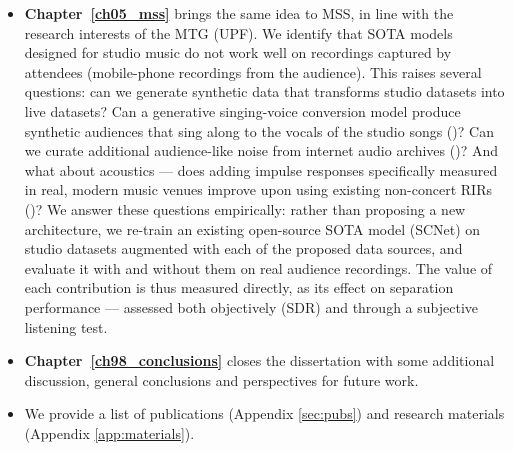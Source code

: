 \begin{itemize}
    \item \textbf{Chapter~\ref{ch05_mss}} brings the same idea to \acrfull{MSS}, in line with the research interests of the MTG (UPF). We identify that \acrfull{SOTA} models designed for studio music do not work well on recordings captured by attendees (mobile-phone recordings from the audience). This raises several questions: can we generate synthetic data that transforms studio datasets into live datasets? Can a generative singing-voice conversion model produce synthetic audiences that sing along to the vocals of the studio songs ()? Can we curate additional audience-like noise from internet audio archives ()? And what about acoustics --- does adding impulse responses specifically measured in real, modern music venues improve upon using existing non-concert \acrshort{RIR}s ()? We answer these questions empirically: rather than proposing a new architecture, we re-train an existing open-source \acrshort{SOTA} model (SCNet) on studio datasets augmented with each of the proposed data sources, and evaluate it with and without them on real audience recordings. The value of each contribution is thus measured directly, as its effect on separation performance --- assessed both objectively (\acrshort{SDR}) and through a subjective listening test.

    \item \textbf{Chapter~\ref{ch98_conclusions}} closes the dissertation with some additional discussion, general conclusions and perspectives for future work.

    \item We provide a list of publications (Appendix \ref{sec:pubs}) and research materials (Appendix \ref{app:materials}).

\end{itemize}

